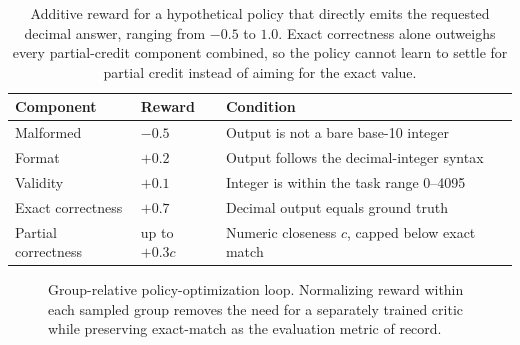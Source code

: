 \documentclass[10pt]{article}
\begin{document}
\begin{table}[H]
\centering
\begin{tabular}{@{}lp{3.0cm}p{7.2cm}@{}}
\toprule
\textbf{Component} & \textbf{Reward} & \textbf{Condition} \\
\midrule
Malformed & $-0.5$ & Output is not a bare base-10 integer \\
Format & $+0.2$ & Output follows the decimal-integer syntax \\
Validity & $+0.1$ & Integer is within the task range 0--4095 \\
Exact correctness & $+0.7$ & Decimal output equals ground truth \\
Partial correctness & up to $+0.3c$ & Numeric closeness $c$, capped below exact match \\
\bottomrule
\end{tabular}
\caption{Additive reward for a hypothetical policy that directly emits the requested
decimal answer, ranging from $-0.5$ to $1.0$. Exact correctness alone
outweighs every partial-credit component combined, so the policy cannot learn to
settle for partial credit instead of aiming for the exact value.}
\label{tab:reward}
\end{table}

\begin{figure}[H]
\centering
{}
\caption{Group-relative policy-optimization loop. Normalizing reward within each
sampled group removes the need for a separately trained critic while preserving
exact-match as the evaluation metric of record.}
\label{fig:grpo}
\end{figure}
\end{document}
